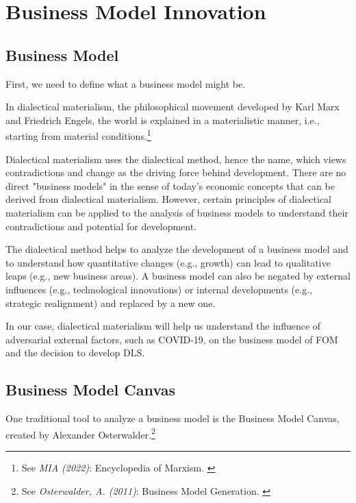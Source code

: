 %
%

\pagebreak
\section{Business Model Innovation}

\onehalfspacing

\subsection{Business Model}

First, we need to define what a business model might be.

In dialectical materialism, the philosophical movement developed by Karl Marx and Friedrich Engels, the world is explained in a materialistic manner, i.e., starting from material conditions.\footnote{See \textit{MIA (2022)}: Encyclopedia of Marxism. \cite{diaMat}}

Dialectical materialism uses the dialectical method, hence the name, which views contradictions and change as the driving force behind development. There are no direct "business models" in the sense of today's economic concepts that can be derived from dialectical materialism. However, certain principles of dialectical materialism can be applied to the analysis of business models to understand their contradictions and potential for development.

The dialectical method helps to analyze the development of a business model and to understand how quantitative changes (e.g., growth) can lead to qualitative leaps (e.g., new business areas). A business model can also be negated by external influences (e.g., technological innovations) or internal developments (e.g., strategic realignment) and replaced by a new one.

In our case, dialectical materialism will help us understand the influence of adversarial external factors, such as COVID-19, on the business model of FOM and the decision to develop DLS.

\subsection{Business Model Canvas}

One traditional tool to analyze a business model is the Business Model Canvas, created by Alexander Osterwalder.\footnote{See \textit{Osterwalder, A. (2011)}: Business Model Generation. \cite{alexBmc}}

